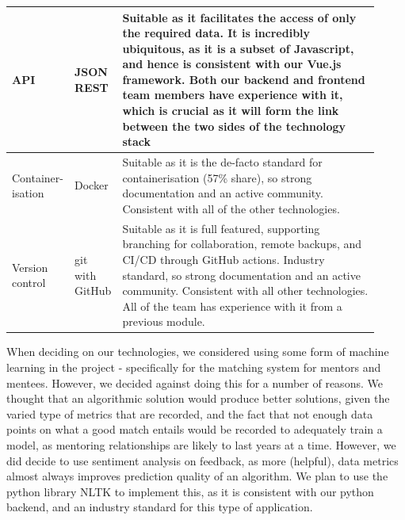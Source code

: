\documentclass[10pt]{article}
\begin{document}
\begin{longtable}{|p{0.085\linewidth}|p{0.09\linewidth}|p{0.75\linewidth}|}
    API
    &
    JSON REST
    &
    Suitable as it facilitates the access of only the required data. It is
    incredibly ubiquitous, as it is a subset of Javascript, and hence is
    consistent with our Vue.js framework. Both our backend and frontend team
    members have experience with it, which is crucial as it will form the link
    between the two sides of the technology stack
    \\ \hline

    Container- isation
    &
    Docker
    &
    Suitable as it is the de-facto standard for containerisation (57\% share),
    so strong documentation and an active community. Consistent with all of the
    other technologies. \\ \hline

    Version control
    &
    git with GitHub
    &
    Suitable as it is full featured, supporting branching for collaboration,
    remote backups, and CI/CD through GitHub actions. Industry standard, so
    strong documentation and an active community. Consistent with all other
    technologies. All of the team has experience with it from a previous module.
    \\ \hline

\end{longtable}

When deciding on our technologies, we considered using some form of machine
learning in the project - specifically for the matching system for mentors and
mentees. However, we decided against doing this for a number of reasons. We
thought that an algorithmic solution would produce better solutions, given the
varied type of metrics that are recorded, and the fact that not enough data
points on what a good match entails would be recorded to adequately train a
model, as mentoring relationships are likely to last years at a time. However,
we did decide to use sentiment analysis on feedback, as more (helpful), data
metrics almost always improves prediction quality of an algorithm. We plan to
use the python library NLTK to implement this, as it is consistent with our
python backend, and an industry standard for this type of application.
\end{document}
